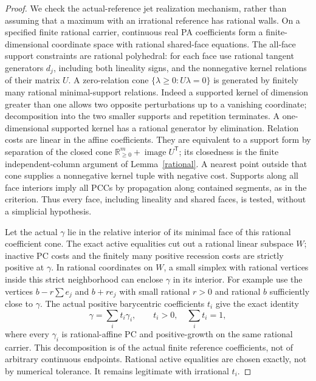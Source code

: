 \documentclass[11pt]{article}
\newcommand{\R}{\mathbb R}
\begin{document}
\begin{proof}
We check the actual-reference jet realization mechanism, rather than assuming that a maximum with an irrational reference has rational walls. On a specified finite rational carrier, continuous real PA coefficients form a finite-dimensional coordinate space with rational shared-face equations. The all-face support constraints are rational polyhedral: for each face use rational tangent generators $d_j$, including both lineality signs, and the nonnegative kernel relations of their matrix $U$. A zero-relation cone $\{\lambda\geq0:U\lambda=0\}$ is generated by finitely many rational minimal-support relations. Indeed a supported kernel of dimension greater than one allows two opposite perturbations up to a vanishing coordinate; decomposition into the two smaller supports and repetition terminates. A one-dimensional supported kernel has a rational generator by elimination. Relation costs are linear in the affine coefficients. They are equivalent to a support form by separation of the closed cone $\R_{\geq0}^m+\operatorname{image}U^\mathsf T$; its closedness is the finite independent-column argument of Lemma~\ref{rational}. A nearest point outside that cone supplies a nonnegative kernel tuple with negative cost. Supports along all face interiors imply all PCCs by propagation along contained segments, as in the criterion. Thus every face, including lineality and shared faces, is tested, without a simplicial hypothesis.

Let the actual $\gamma$ lie in the relative interior of its minimal face of this rational coefficient cone. The exact active equalities cut out a rational linear subspace $W$; inactive PC costs and the finitely many positive recession costs are strictly positive at $\gamma$. In rational coordinates on $W$, a small simplex with rational vertices inside this strict neighborhood can enclose $\gamma$ in its interior. For example use the vertices $b-r\sum e_j$ and $b+r e_j$ with small rational $r>0$ and rational $b$ sufficiently close to $\gamma$. The actual positive barycentric coefficients $t_i$ give the exact identity
\[
 \gamma=\sum_i t_i\gamma_i,\qquad t_i>0,\quad\sum_i t_i=1,
\]
where every $\gamma_i$ is rational-affine PC and positive-growth on the same rational carrier. This decomposition is of the actual finite reference coefficients, not of arbitrary continuous endpoints. Rational active equalities are chosen exactly, not by numerical tolerance. It remains legitimate with irrational $t_i$.


\end{proof}
\end{document}

